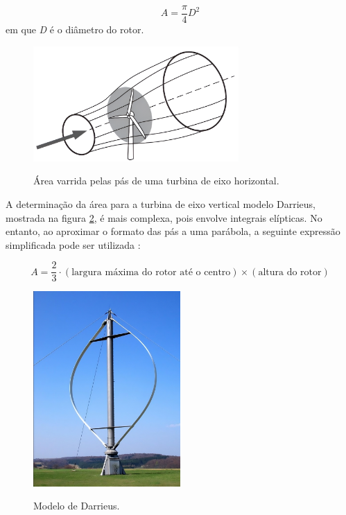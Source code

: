         \begin{equation}
            A = \frac{\pi}{4} D^2  \label{eq:ÁreaTurbinaHorizontal}
        \end{equation}    
      em que \textit{D} é o diâmetro do rotor.
        \begin{figure}[h!]
            \centering
            \caption{Área varrida pelas pás de uma turbina de eixo horizontal.}
            \includegraphics[width=0.7\textwidth]{Figuras/Teorico/areaTurbina.png}
            \label{fig:turbin_area}
        \end{figure}

       
        \par A determinação da área para a turbina de eixo vertical modelo Darrieus, mostrada na figura \ref{fig:Darrieus}, é mais complexa, pois envolve integrais elípticas. No entanto, ao aproximar o formato das pás a uma parábola, a seguinte expressão simplificada pode ser utilizada \cite{fadigas2011}:

        \begin{equation}
            A = \frac{2}{3} \cdot (\text{largura máxima do rotor até o centro}) \times (\text{altura do rotor})
        \end{equation}

         \begin{figure}[h!]
            \centering
            \caption{Modelo de Darrieus.}
            \includegraphics[width=0.5\textwidth]{Figuras/Teorico/modelo Darrieus.jpeg}
            \label{fig:Darrieus}
        \end{figure}

